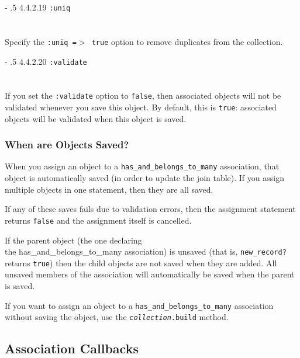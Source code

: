 \documentclass[10pt]{book}
\makeatletter
\renewcommand\paragraph{%
   \@startsection{paragraph}{4}{0mm}%
      {-\baselineskip}%
      {.5\baselineskip}%
      {\normalfont\scriptsize\bfseries}}
\makeatother
\begin{document}
\paragraph{4.4.2.19 \texttt{:uniq}}\\ \\\\

Specify the \texttt{:uniq =$>$ true} option to remove duplicates from the collection.

\paragraph{4.4.2.20 \texttt{:validate}}\\ \\\\

If you set the \texttt{:validate} option to \texttt{false}, then associated objects will not be validated whenever you save this object. By default, this is \texttt{true}: associated objects will be validated when this object is saved.

\subsubsection{ When are Objects Saved?}

When you assign an object to a \texttt{has\_and\_belongs\_to\_many}  association, that object is automatically saved (in order to update the  join table). If you assign multiple objects in one statement, then they  are all saved.

If any of these saves fails due to validation errors, then the assignment statement returns \texttt{false} and the assignment itself is cancelled.

If the parent object (the one declaring \\ the has\_and\_belongs\_to\_many association) is unsaved (that is, \texttt{new\_record?} returns \texttt{true})  then the child objects are not saved when they are added. All unsaved  members of the association will automatically be saved when the parent  is saved.

If you want to assign an object to a \texttt{has\_and\_belongs\_to\_many} association without saving the object, use the \texttt{\emph{collection}.build} method.

\subsection{ Association Callbacks}
\end{document}
